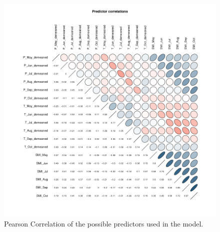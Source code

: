 \documentclass[12pt]{iopart}
\begin{document}
\label{data:1}
\begin{figure}
	\label{f:1}
	\centering
	\includegraphics[width=1\textwidth]{figures/PredictorCorrelation.png}
	\caption{Pearson Correlation of the possible predictors used in the model.}
\end{figure}
\end{document}
